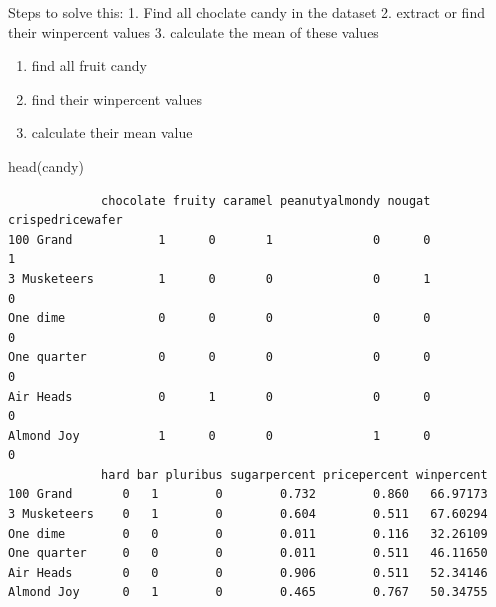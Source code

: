 \documentclass[
  letterpaper,
  DIV=11,
  numbers=noendperiod]{scrartcl}
\newenvironment{Shaded}{\begin{snugshade}}{\end{snugshade}}
\newcommand{\DecValTok}[1]{\textcolor[rgb]{0.68,0.00,0.00}{#1}}
\newcommand{\FunctionTok}[1]{\textcolor[rgb]{0.28,0.35,0.67}{#1}}
\newcommand{\NormalTok}[1]{\textcolor[rgb]{0.00,0.23,0.31}{#1}}
\newcommand{\OtherTok}[1]{\textcolor[rgb]{0.00,0.23,0.31}{#1}}
\newcommand{\SpecialCharTok}[1]{\textcolor[rgb]{0.37,0.37,0.37}{#1}}
\providecommand{\tightlist}{%
  \setlength{\itemsep}{0pt}\setlength{\parskip}{0pt}}
\begin{document}
Steps to solve this: 1. Find all choclate candy in the dataset 2.
extract or find their winpercent values 3. calculate the mean of these
values

\begin{enumerate}
\def\labelenumi{\arabic{enumi}.}
\setcounter{enumi}{3}
\tightlist
\item
  find all fruit candy
\item
  find their winpercent values
\item
  calculate their mean value
\end{enumerate}

\begin{Shaded}
\begin{Highlighting}[]
\FunctionTok{head}\NormalTok{(candy)}
\end{Highlighting}
\end{Shaded}

\begin{verbatim}
             chocolate fruity caramel peanutyalmondy nougat crispedricewafer
100 Grand            1      0       1              0      0                1
3 Musketeers         1      0       0              0      1                0
One dime             0      0       0              0      0                0
One quarter          0      0       0              0      0                0
Air Heads            0      1       0              0      0                0
Almond Joy           1      0       0              1      0                0
             hard bar pluribus sugarpercent pricepercent winpercent
100 Grand       0   1        0        0.732        0.860   66.97173
3 Musketeers    0   1        0        0.604        0.511   67.60294
One dime        0   0        0        0.011        0.116   32.26109
One quarter     0   0        0        0.011        0.511   46.11650
Air Heads       0   0        0        0.906        0.511   52.34146
Almond Joy      0   1        0        0.465        0.767   50.34755
\end{verbatim}

\begin{Shaded}
\end{Shaded}
\end{document}
